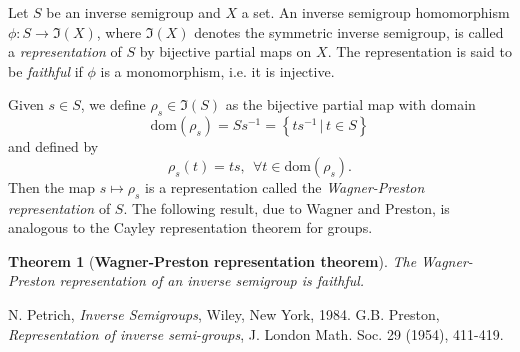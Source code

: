 \documentclass[12pt]{article}
\newtheorem{thm}{Theorem}
\begin{document}


\newcommand{\domi}{\mathrm{dom}}
\newcommand{\rang}{\mathrm{ran}}
\newcommand{\FFF}{\mathfrak{F}}
\newcommand{\III}{\mathfrak{I}}
\newcommand{\cbra}[1]{\left( #1 \right)}
\newcommand{\qbra}[1]{\left[ #1 \right]}
\newcommand{\gbra}[1]{\left\{ #1 \right\}}
\newcommand{\abra}[1]{\left\langle #1 \right\rangle}


Let $S$ be an inverse semigroup and $X$ a set. An inverse semigroup homomorphism $\phi:S\rightarrow\III(X)$, where $\III(X)$ denotes the symmetric inverse semigroup, is called a \emph{representation} of $S$ by bijective partial maps on $X$. The representation is said to be \emph{faithful} if $\phi$ is a monomorphism, i.e. it is injective.

Given $s\in S$, we define $\rho_s\in\III(S)$ as the bijective partial map with domain 
$$\domi(\rho_s)=Ss^{-1}=\gbra{ts^{-1}\,|\,t\in S}$$ 
and defined by
$$\rho_s(t)=ts,\ \ \forall t\in \domi(\rho_s).$$
Then the map $s\mapsto\rho_s$ is a representation  called the \emph{Wagner-Preston representation} of $S$. The following result, due to Wagner and Preston, is analogous to the Cayley representation theorem for groups.\\




\begin{thm}[\textbf{Wagner-Preston representation theorem}]
The Wagner-Preston representation of an inverse semigroup is faithful.
\end{thm}

\begin{thebibliography}{9}
 N. Petrich, \emph{Inverse Semigroups}, Wiley, New York, 1984.
 G.B. Preston, \emph{Representation of inverse semi-groups}, J. London Math. Soc. 29 (1954), 411-419.
\end{thebibliography}
\end{document}
